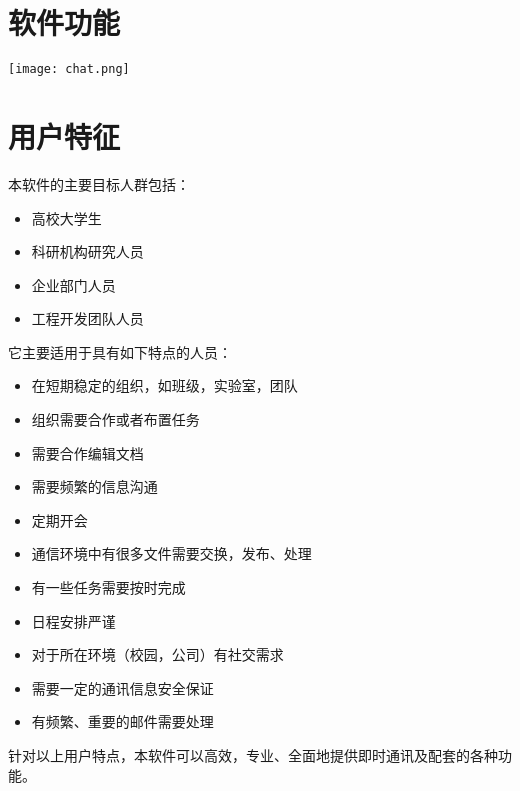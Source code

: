 \section{软件功能}
\begin{center}
	\texttt{[image: chat.png]}
\end{center}
\section{用户特征}
\noindent
	本软件的主要目标人群包括：
	\begin{itemize}
		\item 高校大学生
		\item 科研机构研究人员
		\item 企业部门人员
		\item 工程开发团队人员
	\end{itemize}
	它主要适用于具有如下特点的人员：
	\begin{itemize}
		\item 在短期稳定的组织，如班级，实验室，团队
		\item 组织需要合作或者布置任务
		\item 需要合作编辑文档
		\item 需要频繁的信息沟通
		\item 定期开会
		\item 通信环境中有很多文件需要交换，发布、处理
		\item 有一些任务需要按时完成
		\item 日程安排严谨
		\item 对于所在环境（校园，公司）有社交需求
		\item 需要一定的通讯信息安全保证
		\item 有频繁、重要的邮件需要处理
	\end{itemize}
	针对以上用户特点，本软件可以高效，专业、全面地提供即时通讯及配套的各种功能。
